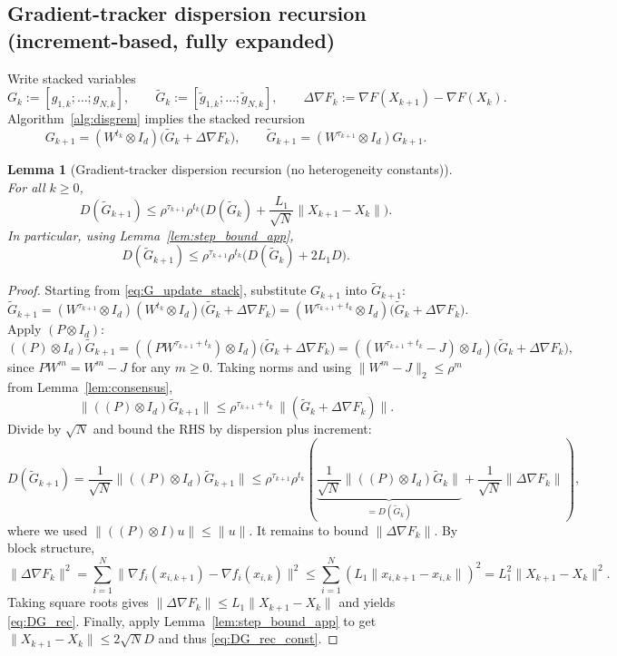 \documentclass[11pt,a4paper]{article}
\def\one{1}%
\def\J{J}%
\def\Pmat{P}%
\newtheorem{lemma}[theorem]{Lemma}
\newcommand{\one}{\mathbf{1}}
\newcommand{\J}{\left(\frac{1}{N}\one\one^\top\right)}
\newcommand{\Pmat}{I-\J}
\begin{document}
\subsection{Gradient-tracker dispersion recursion (increment-based, fully expanded)}

Write stacked variables
\[
G_k:=[g_{1,k};\dots;g_{N,k}],\qquad \tilde G_k:=[\tilde g_{1,k};\dots;\tilde g_{N,k}],
\qquad
\Delta\nabla F_k:=\nabla F(X_{k+1})-\nabla F(X_k).
\]
Algorithm~\ref{alg:disgrem} implies the stacked recursion
\begin{equation}\label{eq:G_update_stack}
G_{k+1}=(W^{t_k}\otimes I_d)\big(\tilde G_k+\Delta\nabla F_k\big),
\qquad
\tilde G_{k+1}=(W^{\tau_{k+1}}\otimes I_d)G_{k+1}.
\end{equation}

\begin{lemma}[Gradient-tracker dispersion recursion (no heterogeneity constants)]\label{lem:DG_rec}
For all $k\ge0$,
\begin{equation}\label{eq:DG_rec}
D(\tilde G_{k+1})
\le \rho^{\tau_{k+1}}\rho^{t_k}\Big(D(\tilde G_k)+\frac{L_1}{\sqrt N}\|X_{k+1}-X_k\|\Big).
\end{equation}
In particular, using Lemma~\ref{lem:step_bound_app},
\begin{equation}\label{eq:DG_rec_const}
D(\tilde G_{k+1})
\le \rho^{\tau_{k+1}}\rho^{t_k}\Big(D(\tilde G_k)+2L_1D\Big).
\end{equation}
\end{lemma}
\begin{proof}
Starting from \eqref{eq:G_update_stack}, substitute $G_{k+1}$ into $\tilde G_{k+1}$:
\[
\tilde G_{k+1}=(W^{\tau_{k+1}}\otimes I_d)(W^{t_k}\otimes I_d)\big(\tilde G_k+\Delta\nabla F_k\big)
=(W^{\tau_{k+1}+t_k}\otimes I_d)\big(\tilde G_k+\Delta\nabla F_k\big).
\]
Apply $(\Pmat\otimes I_d)$:
\[
((\Pmat)\otimes I_d)\tilde G_{k+1}
=((\Pmat W^{\tau_{k+1}+t_k})\otimes I_d)\big(\tilde G_k+\Delta\nabla F_k\big)
=((W^{\tau_{k+1}+t_k}-\J)\otimes I_d)\big(\tilde G_k+\Delta\nabla F_k\big),
\]
since $\Pmat W^m=W^m-\J$ for any $m\ge0$.
Taking norms and using $\|W^{m}-\J\|_2\le \rho^{m}$ from Lemma~\ref{lem:consensus},
\[
\|((\Pmat)\otimes I_d)\tilde G_{k+1}\|
\le \rho^{\tau_{k+1}+t_k}\,\|(\tilde G_k+\Delta\nabla F_k)\|.
\]
Divide by $\sqrt N$ and bound the RHS by dispersion plus increment:
\[
D(\tilde G_{k+1})
=\frac1{\sqrt N}\|((\Pmat)\otimes I_d)\tilde G_{k+1}\|
\le \rho^{\tau_{k+1}}\rho^{t_k}\left(
\underbrace{\frac1{\sqrt N}\|((\Pmat)\otimes I_d)\tilde G_k\|}_{=D(\tilde G_k)}
+\frac1{\sqrt N}\|\Delta\nabla F_k\|\right),
\]
where we used $\|((\Pmat)\otimes I)u\|\le \|u\|$.
It remains to bound $\|\Delta\nabla F_k\|$.
By block structure,
\[
\|\Delta\nabla F_k\|^2
=\sum_{i=1}^N\|\nabla f_i(x_{i,k+1})-\nabla f_i(x_{i,k})\|^2
\le \sum_{i=1}^N (L_1\|x_{i,k+1}-x_{i,k}\|)^2
=L_1^2\|X_{k+1}-X_k\|^2.
\]
Taking square roots gives $\|\Delta\nabla F_k\|\le L_1\|X_{k+1}-X_k\|$ and yields \eqref{eq:DG_rec}.
Finally, apply Lemma~\ref{lem:step_bound_app} to get $\|X_{k+1}-X_k\|\le 2\sqrt N D$ and thus \eqref{eq:DG_rec_const}.
\end{proof}
\end{document}
